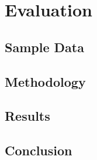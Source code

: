 \section{Evaluation}\label{sec:evaluation}

\subsection{Sample Data}

\subsection{Methodology}

\subsection{Results}

\subsection{Conclusion}